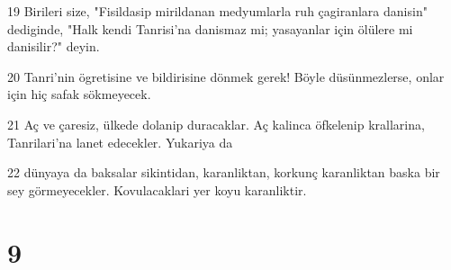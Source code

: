 \par 19 Birileri size, "Fisildasip mirildanan medyumlarla ruh çagiranlara danisin" dediginde, "Halk kendi Tanrisi'na danismaz mi; yasayanlar için ölülere mi danisilir?" deyin.
\par 20 Tanri'nin ögretisine ve bildirisine dönmek gerek! Böyle düsünmezlerse, onlar için hiç safak sökmeyecek.
\par 21 Aç ve çaresiz, ülkede dolanip duracaklar. Aç kalinca öfkelenip krallarina, Tanrilari'na lanet edecekler. Yukariya da
\par 22 dünyaya da baksalar sikintidan, karanliktan, korkunç karanliktan baska bir sey görmeyecekler. Kovulacaklari yer koyu karanliktir.

\chapter{9}

